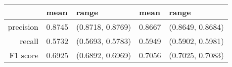 \begin{table}[ht]
\centering
\begin{tabular}{rllll}
  \hline
 & mean & range & mean & range \\ 
  \hline
precision & 0.8745 & (0.8718, 0.8769) & 0.8667 & (0.8649, 0.8684) \\ 
  recall & 0.5732 & (0.5693, 0.5783) & 0.5949 & (0.5902, 0.5981) \\ 
  F1 score & 0.6925 & (0.6892, 0.6969) & 0.7056 & (0.7025, 0.7083) \\ 
   \hline
\end{tabular}
\end{table}
